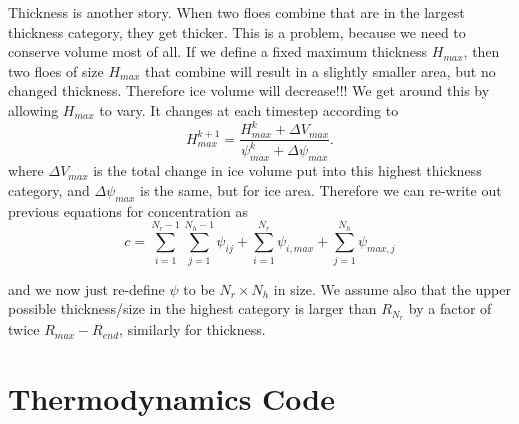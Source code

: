 \documentclass{article}
\begin{document}
Thickness is another story. When two floes combine that are in the largest thickness category, they get thicker. This is a problem, because we need to conserve volume most of all. If we define a fixed maximum thickness $H_{max}$, then two floes of size $H_{max}$ that combine will result in a slightly smaller area, but no changed thickness. Therefore ice volume will decrease!!! We get around this by allowing $H_{max}$ to vary. It changes at each timestep according to 
\begin{equation}
H_{max}^{k+1} = \frac{H_{max}^k + \Delta V_{max}}{\psi_{max}^k + \Delta \psi_{max}}.  
\end{equation}
where $\Delta V_{max}$ is the total change in ice volume put into this highest thickness category, and $\Delta \psi_{max}$ is the same, but for ice area. Therefore we can re-write out previous equations for concentration as 
$$ c = \sum\limits_{i=1}^{N_r-1}\sum\limits_{j=1}^{N_h-1} \psi_{ij} + \sum\limits_{i=1}^{N_r} \psi_{i,max} + \sum\limits_{j=1}^{N_h} \psi_{max,j}$$

and we now just re-define $\psi$ to be $N_r \times N_h$ in size. We assume also that the upper possible thickness/size in the highest category is larger than $R_{N_r}$ by a factor of twice $R_{max}-R_{end}$, similarly for thickness. 

\section{Thermodynamics Code}
\end{document}
